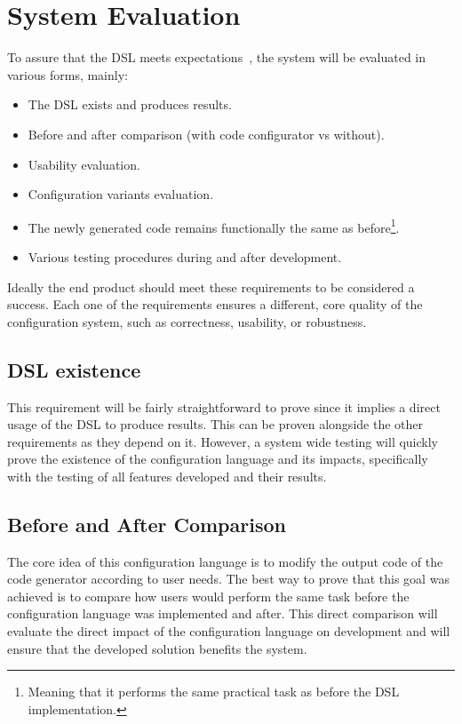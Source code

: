 \section{System Evaluation}
\label{sec:sys_eval}

To assure that the \gls{DSL} meets expectations~\cite{Voelter_Benz_2013}, the system will be evaluated in various forms, mainly:

\begin{itemize}
	\item The \gls{DSL} exists and produces results.
	\item Before and after comparison (with code configurator vs without).
	\item Usability evaluation.
	\item Configuration variants evaluation.
	\item The newly generated code remains functionally the same as before\footnote{Meaning that it performs the same practical task as before the \gls{DSL} implementation.}.
	\item Various testing procedures during and after development.
\end{itemize}

Ideally the end product should meet these requirements to be considered a success. Each one of the requirements ensures a different, core quality of the configuration system, such as correctness, usability, or robustness.

\subsection*{DSL existence}

This requirement will be fairly straightforward to prove since it implies a direct usage of the \gls{DSL} to produce results. This can be proven alongside the other requirements as they depend on it. However, a system wide testing will quickly prove the existence of the configuration language and its impacts, specifically with the testing of all features developed and their results.

\subsection*{Before and After Comparison}

The core idea of this configuration language is to modify the output code of the code generator according to user needs. The best way to prove that this goal was achieved is to compare how users would perform the same task before the configuration language was implemented and after. This direct comparison will evaluate the direct impact of the configuration language on development and will ensure that the developed solution benefits the system. 

